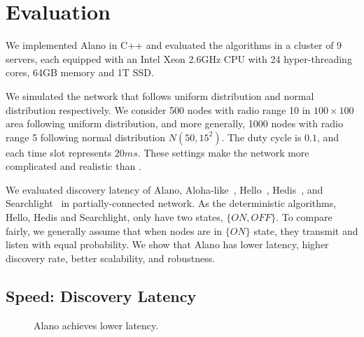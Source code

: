 \section{Evaluation}
\label{Evaluation}


We implemented Alano in C++ and evaluated the algorithms in a cluster of 9 servers, 
each equipped with an Intel Xeon 2.6GHz CPU with 24 hyper-threading cores, 64GB memory and 1T SSD. 

We simulated the network that follows uniform distribution and normal distribution respectively. 
We consider 500 nodes with radio range 10 in $100\times100$ area following uniform distribution, 
and more generally, 1000 nodes with radio range 5 following normal distribution $N(50, 15^2)$. 
The duty cycle is $0.1$, and each time slot represents $20ms$. 
These settings make the network more complicated and realistic than  
\cite{wang2015blinddate, qiu2016talk, sun2014hello, bakht2012searchlight, 
chen2015heterogeneous, kandhalu2010u, you2011aloha, 
mcglynn2001birthday, song2014probabilistic, vasudevan2009neighbor}.



We evaluated discovery latency of Alano, Aloha-like~\cite{you2011aloha}, Hello~\cite{sun2014hello}, Hedis~\cite{chen2015heterogeneous}, and Searchlight~\cite{bakht2012searchlight} in partially-connected network. As the deterministic algorithms, Hello, Hedis and Searchlight, only have two states, $\{ON, OFF\}$. To compare fairly, we generally assume that when nodes are in $\{ON\}$ state, they transmit and listen with equal probability.
We show that Alano has lower latency, higher discovery rate, better scalability, and robustness.

\subsection{Speed: Discovery Latency}

\begin{figure}[!h]
\centering
{}
\hspace{0.01in}
\caption{Alano achieves lower latency.}
\label{fig_latency}
\end{figure}

